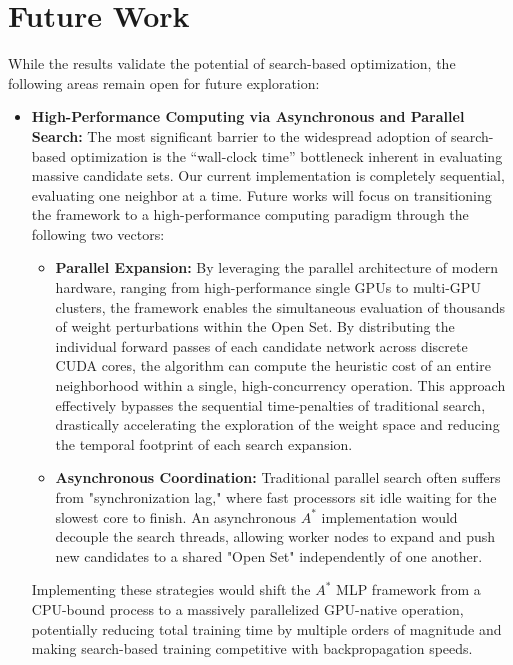 \section{Future Work}

While the results validate the potential of search-based optimization, the following areas remain open for future exploration:

\begin{itemize}
\item \textbf{High-Performance Computing via Asynchronous and Parallel Search:} 
The most significant barrier to the widespread adoption of search-based optimization is the ``wall-clock time'' bottleneck inherent in evaluating massive candidate sets. Our current implementation is completely sequential, evaluating one neighbor at a time. Future works will focus on transitioning the framework to a high-performance computing paradigm through the following two vectors:

\begin{itemize}
    \item \textbf{Parallel Expansion:} By leveraging the parallel architecture of modern hardware, ranging from high-performance single GPUs to multi-GPU clusters, the framework enables the simultaneous evaluation of thousands of weight perturbations within the Open Set. By distributing the individual forward passes of each candidate network across discrete CUDA cores, the algorithm can compute the heuristic cost of an entire neighborhood within a single, high-concurrency operation. This approach effectively bypasses the sequential time-penalties of traditional search, drastically accelerating the exploration of the weight space and reducing the temporal footprint of each search expansion.
    
    \item \textbf{Asynchronous Coordination:} Traditional parallel search often suffers from "synchronization lag," where fast processors sit idle waiting for the slowest core to finish. An asynchronous $A^*$ implementation would decouple the search threads, allowing worker nodes to expand and push new candidates to a shared "Open Set" independently of one another. 
\end{itemize}

Implementing these strategies would shift the $A^*$ MLP framework from a CPU-bound process to a massively parallelized GPU-native operation, potentially reducing total training time by multiple orders of magnitude and making search-based training competitive with backpropagation speeds.    
    

\end{itemize}
